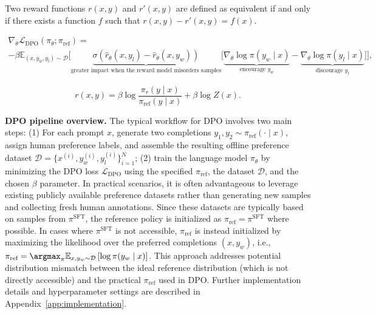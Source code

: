 \begin{definition}
Two reward functions $r(x, y)$ and $r'(x, y)$ are defined as equivalent if and only if there exists a function $f$ such that ${r(x, y)-r'(x, y) = f(x)}$.
\end{definition}

\begin{multline*}\label{eq:gradient}
    \nabla_\theta \mathcal{L}_\text{DPO}(\pi_\theta;\pi_\text{ref}) = \\ -\beta\mathbb{E}_{(x, y_w, y_l) \sim \mathcal{D}} \bigg[\underbrace{\sigma(\hat{r}_\theta(x, y_l) - \hat{r}_\theta (x, y_w))}_\text{greater impact when the reward model misorders samples}\bigg[\underbrace{\nabla_\theta\log \pi(y_w \mid x)}_\text{encourage $y_w$} - \underbrace{\nabla_\theta\log\pi(y_l \mid x)}_\text{discourage $y_l$}\bigg]\bigg],
\end{multline*}

\begin{equation}\label{eq:main_eq}
    r(x,y) =\beta \log \frac{\pi_r(y\mid x)}{\pi_\text{ref}(y\mid x)} + \beta \log Z(x).
\end{equation}

\textbf{DPO pipeline overview.} The typical workflow for DPO involves two main steps: (1) For each prompt $x$, generate two completions $y_1, y_2 \sim \pi_\text{ref}(\cdot \mid x)$, assign human preference labels, and assemble the resulting offline preference dataset $\mathcal{D} = \{x^{(i)}, y_w^{(i)}, y_l^{(i)}\}_{i=1}^N$; (2) train the language model $\pi_\theta$ by minimizing the DPO loss $\mathcal{L}_\text{DPO}$ using the specified $\pi_\text{ref}$, the dataset $\mathcal{D}$, and the chosen $\beta$ parameter. In practical scenarios, it is often advantageous to leverage existing publicly available preference datasets rather than generating new samples and collecting fresh human annotations. Since these datasets are typically based on samples from $\pi^\text{SFT}$, the reference policy is initialized as $\pi_\text{ref} = \pi^\text{SFT}$ where possible. In cases where $\pi^\text{SFT}$ is not accessible, $\pi_\text{ref}$ is instead initialized by maximizing the likelihood over the preferred completions ${(x, y_w)}$, i.e., ${\pi_\text{ref} = \argmax_{\pi}\mathbb{E}_{x, y_w \sim \mathcal{D}}\left[\log \pi(y_w \mid x)\right]}$. This approach addresses potential distribution mismatch between the ideal reference distribution (which is not directly accessible) and the practical $\pi_\text{ref}$ used in DPO. Further implementation details and hyperparameter settings are described in Appendix~\ref{app:implementation}.

